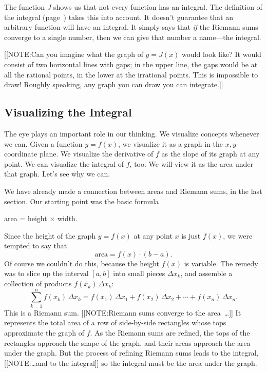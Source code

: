 The function $J$ shows us that not every function has an integral.
The definition of the integral (page~\pageref{def}) takes this into
account.  It doesn't guarantee that an arbitrary function will have an
integral.  It simply says that {\em if\/} the Riemann sums converge to
a single number, then we can give that number a name---the integral.

[[NOTE:Can you imagine what the graph of $y = J(x)$ would look like?
  It would consist of two horizontal lines with gaps; in the upper
  line, the gaps would be at all the rational points, in the lower at
  the irrational points.  This is impossible to draw!  Roughly
  speaking, any graph you can draw you can integrate.]]


\subsection{Visualizing the Integral}
\label{subsec:visualizing-the-integral}

The eye plays an important role in our thinking.  We visualize
concepts whenever we can.  Given a function $y = f(x)$, we visualize
it as a graph in the $x, y$-coordinate plane.  We visualize the
derivative of $f$ as the slope of its graph at any point.  We can
visualize the integral of $f$, too.  We will view it as the area under
that graph.  Let's see why we can.

We have already made a connection between areas and Riemann sums, in
the last section.  Our starting point was the basic formula
	\begin{center}
	area = height $\times$ width.
	\end{center}
Since the height of the graph $y = f(x)$ at any point $x$ is just
$f(x)$, we were tempted to say that
\[
\mbox{area} = f(x) \cdot (b - a).
\]
Of course we couldn't do this, because the height $f(x)$ is variable.
The remedy was to slice up the interval $[a, b]$ into small pieces
$\Delta x_k$, and assemble a collection of products $f(x_k)\, \Delta
x_k$:
\[
\sum_{k = 1}^n f(x_k)\,\Delta x_k =
		f(x_1)\, \Delta x_1 +
		f(x_2)\, \Delta x_2 + \cdots +
		f(x_n)\, \Delta x_n.
\]
This is a Riemann sum.  
	[[NOTE:Riemann sums converge to the area~\ldots]]
It represents the total area of a row of side-by-side rectangles whose tops approximate the graph of $f$.  As the Riemann sums are refined, the tops of the rectangles approach the shape of the graph, and their areas approach the area under the graph.  But the process of refining Riemann sums leads to the integral, 
	[[NOTE:\ldots and to the integral]]
so the integral must be the area under the graph.

